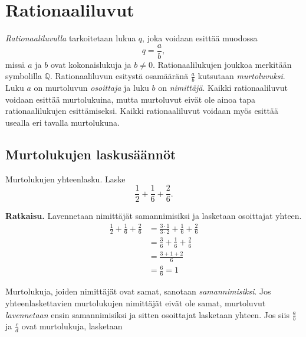 \chapter{Rationaaliluvut}
    \label{rationaaliluvut}
    
    \emph{Rationaaliluvulla} tarkoitetaan lukua $q$, joka voidaan esittää muodossa
    \[
    q=\frac{a}{b}, 
    \]
    missä $a$ ja $b$ ovat kokonaislukuja ja $b\neq 0$. Rationaalilukujen joukkoa
    merkitään symbolilla $\mathbb{Q}$. Rationaaliluvun esitystä osamääränä
    $\frac{a}{b}$ kutsutaan \emph{murtoluvuksi}. Luku $a$ on murtoluvun
    \emph{osoittaja} ja luku $b$ on \emph{nimittäjä}. Kaikki rationaaliluvut
    voidaan esittää murtolukuina, mutta murtoluvut eivät ole ainoa tapa
    rationaalilukujen esittämiseksi. Kaikki rationaaliluvut voidaan myös
    esittää usealla eri tavalla murtolukuna.
    
\section{Murtolukujen laskusäännöt}

\begin{esimerkki}
        Murtolukujen yhteenlasku. Laske
        \[
        \frac{1}{2} + \frac{1}{6} + \frac{2}{6}.
        \]
        
        \textbf{Ratkaisu.}
        Lavennetaan nimittäjät samannimisiksi ja lasketaan osoittajat yhteen.
        \begin{align*}
            \frac{1}{2} + \frac{1}{6} + \frac{2}{6}
            &=
            \frac{3\cdot 1}{3\cdot 2} + \frac{1}{6} + \frac{2}{6}\\
            &=
            \frac{3}{6} + \frac{1}{6} + \frac{2}{6}\\
            &= \frac{3+1+2}{6}\\ &= \frac{6}{6} = 1
        \end{align*}
    \end{esimerkki}


    Murtolukuja, joiden nimittäjät ovat samat, sanotaan \emph{samannimisiksi}.
    Jos yhteenlaskettavien murtolukujen nimittäjät eivät ole samat, murtoluvut
    \emph{lavennetaan} ensin samannimisiksi ja sitten osoittajat lasketaan yhteen.
    Jos siis $\frac{a}{b}$ ja $\frac{c}{d}$ ovat murtolukuja, lasketaan

